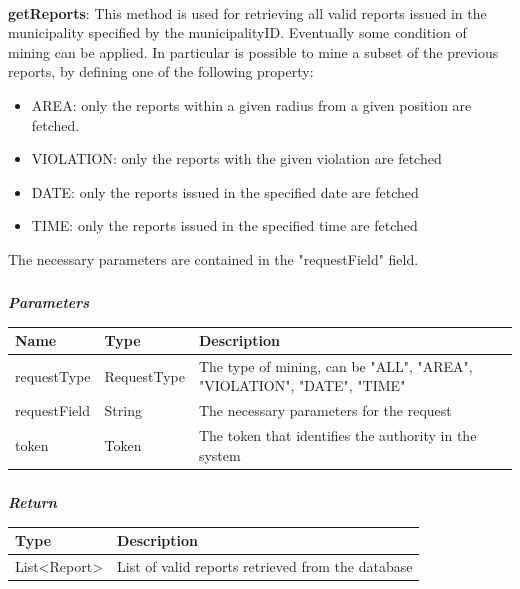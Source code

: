 				\paragraph{}
							\textbf{getReports}: This method is used for retrieving all valid reports issued in the municipality specified by the municipalityID. Eventually some condition of mining can be applied. In particular is possible to mine a subset of the previous reports, by defining one of the following property:
							\begin{itemize}
								\item AREA: only the reports within a given radius from a given position are fetched.
								\item VIOLATION: only the reports with the given violation are fetched
								\item DATE: only the reports issued in the specified date are fetched
								\item TIME: only the reports issued in the specified time are fetched
							\end{itemize}
							The necessary parameters are contained in the "requestField" field. 
							\subparagraph{}
							\textit{\textbf{Parameters}}
								\begin{table}[!h]
									\begin{tabular}{L{0.2\textwidth}L{0.2\textwidth}L{0.2\textwidth}}
										\toprule
										Name & Type & Description \\
										\midrule
								  		requestType & RequestType & The type of mining, can be "ALL", "AREA", "VIOLATION", "DATE", "TIME" \\
								  		requestField & String & The necessary parameters for the request \\
								  		token & Token & The token that identifies the authority in the system \\
								 		\bottomrule
									\end{tabular}
								\end{table}
							\subparagraph{}
								\textit{\textbf{Return}}
									\begin{table}[!h]
									\begin{tabular}{L{0.3\textwidth}L{0.3\textwidth}}
										\toprule
										Type & Description \\
										\midrule
								  		List<Report> & List of valid reports retrieved from the database \\
								 		\bottomrule
									\end{tabular}
								\end{table}

